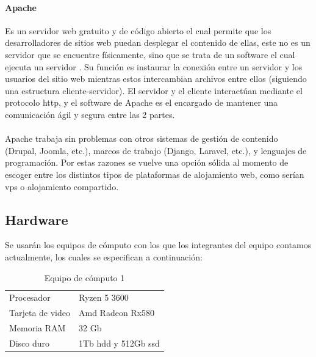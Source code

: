 \documentclass[12pt, a4paper, titlepage]{report}
\begin{document}
		   	\paragraph{Apache \\}
		   	Es un servidor web gratuito y de código abierto el cual permite que los desarrolladores de sitios web puedan desplegar el contenido de ellas, este no es un servidor que se encuentre físicamente, sino que se trata de un software el cual ejecuta un servidor \cite{refTomcat}. Su función es instaurar la conexión entre un servidor y los usuarios del sitio web mientras estos intercambian archivos entre ellos (siguiendo una estructura cliente-servidor). El servidor y el cliente interactúan mediante el protocolo \acrshort{http}, y el software de Apache es el encargado de mantener una comunicación ágil y segura entre las 2 partes.\\\\
		   	Apache trabaja sin problemas con otros sistemas de gestión de contenido (Drupal, Joomla, etc.), marcos de trabajo (Django, Laravel, etc.), y lenguajes de programación. Por estas razones se vuelve una opción sólida al momento de escoger entre los distintos tipos de plataformas de alojamiento web, como serían \acrfull{vps} o alojamiento compartido.\\
			   	\subsection{Hardware}
		Se usarán los equipos de cómputo con los que los integrantes del equipo contamos actualmente, los cuales se especifican a continuación: 
		\begin{table}[H]
			\caption[Equipo de cómputo 1]{Equipo de cómputo 1}
			\begin{tabular}{|p{3.5cm}||p{10cm}|}
				\rowcolor{guindapoli}
				\multicolumn{2}{|c|}{\textbf{\textcolor{white}{Equipo de cómputo utilizado.}}}\\
				\hline
				\rowcolor{azulclaro}Procesador & Ryzen 5 3600\\
				\hline
				\rowcolor{white}Tarjeta de video & Amd Radeon Rx580\\
				\hline
				\rowcolor{azulclaro}Memoria RAM & 32 Gb\\
				\hline
				\rowcolor{white}Disco duro & 1Tb \acrshort{hdd} y 512Gb \acrshort{ssd}\\
				\hline
			\end{tabular}
		\end{table}
\end{document}
